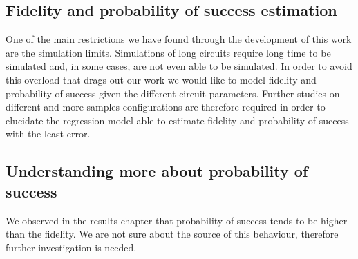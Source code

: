 \subsection*{Fidelity and probability of success estimation}
\label{sec:orgf1b0bfe}

One of the main restrictions we have found through the development of this work are the simulation limits.
Simulations of long circuits require long time to be simulated and, in some cases, are not even able to be simulated.
In order to avoid this overload that drags out our work we would like to model fidelity and probability of success given the different circuit parameters.
Further studies on different and more samples configurations are therefore required in order to elucidate the regression model able to estimate fidelity and probability of success with the least error.

\subsection*{Understanding more about probability of success}
\label{sec:orgbdc5ccb}

We observed in the results chapter that probability of success tends to be higher than the fidelity.
We are not sure about the source of this behaviour, therefore further investigation is needed.